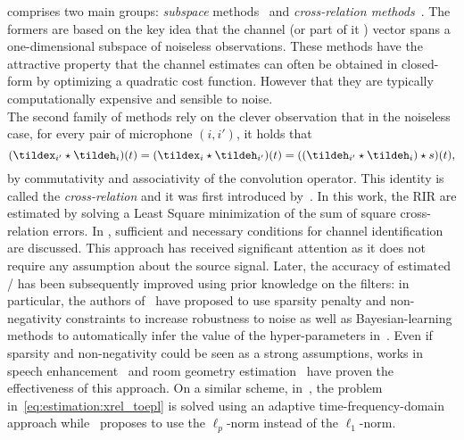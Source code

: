  comprises two main groups: \textit{subspace} methods~ and \textit{cross-relation methods}~.
The formers are based on the key idea that the channel (or part of it ) vector spans a one-dimensional subspace of noiseless observations.
These methods have the attractive property that the channel estimates can often be obtained in closed-form by optimizing a quadratic cost function.
However that they are typically computationally expensive and sensible to noise.
\\The second family of methods rely on the clever observation that in the noiseless case, for every pair of microphone $(i, i')$, it holds that
\begin{equation}\label{eq:estimation:xrel_toepl}
    (\tildex_{i'} \convCont \tildeh_i)(t) = (\tildex_{i} \convCont \tildeh_{i'})(t) =  ((\tildeh_{i'} \convCont \tildeh_i) \convCont s)(t)
    ,
\end{equation}
by commutativity and associativity of the convolution operator.
This identity is called the \textit{cross-relation} and it was first introduced by~.
In this work, the \ac{RIR} are estimated by solving a Least Square minimization of the sum of square cross-relation errors.
In , sufficient and necessary conditions for channel identification are discussed.
This approach has received significant attention as it does not require any assumption about the source signal.
Later, the accuracy of estimated \RIRs/ has been subsequently improved using prior knowledge on the filters:
in particular, the authors of~ have proposed to use sparsity penalty and non-negativity constraints to increase robustness to noise as well as Bayesian-learning methods to automatically infer the value of the hyper-parameters in~.
Even if sparsity and non-negativity could be seen as a strong assumptions, works in speech enhancement~ and room geometry estimation~ have proven the effectiveness of this approach.
On a similar scheme, in~, the problem in~\cref{eq:estimation:xrel_toepl} is solved using an adaptive time-frequency-domain approach while~ proposes to use the $\ell_p$-norm instead of the $\ell_1$-norm.
